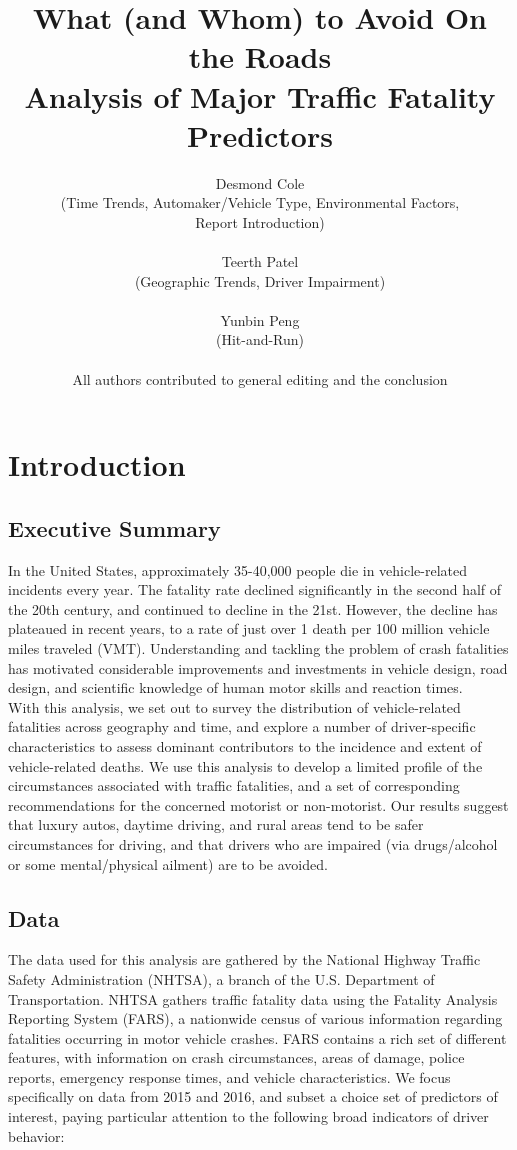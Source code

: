 \documentclass[11pt, oneside,titlepage]{article}   	%
\title{\textbf{What (and Whom) to Avoid On the Roads \\ 
\large Analysis of Major Traffic Fatality Predictors}}
\author{Desmond Cole \\
(Time Trends, Automaker/Vehicle Type, Environmental Factors, \\
Report Introduction) \\
\\
Teerth Patel \\
(Geographic Trends, Driver Impairment) \\
\\
Yunbin Peng \\
(Hit-and-Run) \\
\\ 
All authors contributed to general editing and the conclusion}
\begin{document}
\maketitle
\section*{Introduction}
\subsection*{Executive Summary}
In the United States, approximately 35-40,000 people die in vehicle-related incidents every year. The fatality rate declined significantly in the second half of the 20th century, and continued to decline in the 21st. However, the decline has plateaued in recent years, to a rate of just over 1 death per 100 million vehicle miles traveled (VMT). Understanding and tackling the problem of crash fatalities has motivated considerable improvements and investments in vehicle design, road design, and scientific knowledge of human motor skills and reaction times. \\ 

With this analysis, we set out to survey the distribution of vehicle-related fatalities across geography and time, and explore a number of driver-specific characteristics to assess dominant contributors to the incidence and extent of vehicle-related deaths. We use this analysis to develop a limited profile of the circumstances associated with traffic fatalities, and a set of corresponding recommendations for the concerned motorist or non-motorist. Our results suggest that luxury autos, daytime driving, and rural areas tend to be safer circumstances for driving, and that drivers who are impaired (via drugs/alcohol or some mental/physical ailment) are to be avoided.  

\subsection*{Data}
The data used for this analysis are gathered by the National Highway Traffic Safety Administration (NHTSA), a branch of the U.S. Department of Transportation. NHTSA gathers traffic fatality data using the Fatality Analysis Reporting System (FARS), a nationwide census of various information regarding fatalities occurring in motor vehicle crashes. FARS contains a rich set of different features, with information on crash circumstances, areas of damage, police reports, emergency response times, and vehicle characteristics. We focus specifically on data from 2015 and 2016, and subset a choice set of predictors of interest, paying particular attention to the following broad indicators of driver behavior:
\end{document}
